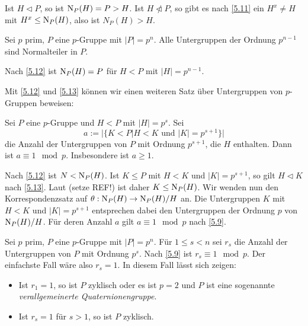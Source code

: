 \begin{beweis}
 Ist $H \vartriangleleft P$, so ist $\operatorname{N}_P(H)=P > H$. Ist $H\ntriangleleft P$, so gibt es nach \ref{5.11} ein $H^x \neq H$ mit $H^x\leq \operatorname{N}_P(H)$, also ist $N_P(H) > H$.
\end{beweis}

\begin{folgerung} \label{5.13}
 Sei $p$ prim, $P$ eine $p$-Gruppe mit $|P|=p^n$. Alle Untergruppen der Ordnung $p^{n-1}$ sind Normalteiler in $P$.
\end{folgerung}
\begin{beweis}
 Nach \ref{5.12} ist $\operatorname{N}_P(H) = P$ f\"ur $H < P$ mit $|H| = p^{n-1}$.
\end{beweis}

Mit \ref{5.12} und \ref{5.13} k\"onnen wir einen weiteren Satz \"uber Untergruppen von $p$-Gruppen beweisen:

\begin{satz}\label{5.14}
Sei $P$ eine $p$-Gruppe und $H < P$ mit $|H|=p^s$. Sei $$a:=|\lbrace K < P|H < K \text{ und } |K|=p^{s+1}\rbrace|$$ die Anzahl der Untergruppen von $P$ mit Ordnung $p^{s+1}$, die $H$ enthalten. Dann ist $a\equiv 1 \mod p$. Insbesondere ist $a\geq 1$.
\end{satz}

\begin{beweis}
 Nach \ref{5.12} ist $N < \operatorname{N}_P(H)$. Ist $K\leq P$ mit $H < K$ und $|K|=p^{s+1}$, so gilt $H\vartriangleleft K$ nach \ref{5.13}. Laut (setze REF!) ist daher $K\leq \operatorname{N}_P(H)$. Wir wenden nun den Korrespondenzsatz auf $\theta:\operatorname{N}_P(H)\to \operatorname{N}_P(H)/H$ an. Die Untergruppen $K$ mit $H < K$ und $|K|=p^{s+1}$ entsprechen dabei den Untergruppen der Ordnung $p$ von $\operatorname{N}_P(H)/H$. F\"ur deren Anzahl $a$ gilt $a\equiv 1\mod p$ nach \ref{5.9}.
\end{beweis}

\begin{bemerkung}
 Sei $p$ prim, $P$ eine $p$-Gruppe mit $|P|=p^n$. F\"ur $1\leq s < n$ sei $r_s$ die Anzahl der Untergruppen von $P$ mit Ordnung $p^s$. Nach \ref{5.9} ist $r_s\equiv 1\mod p$. Der einfachste Fall w\"are also $r_s=1$. In diesem Fall l\"asst sich zeigen:
\begin{itemize}
 \item Ist $r_1=1$, so ist $P$ zyklisch oder es ist $p=2$ und $P$ ist eine sogenannte \emph{verallgemeinerte Quaternionengruppe}.
 \item Ist $r_s=1$ f\"ur $s > 1$, so ist $P$ zyklisch.
\end{itemize}

\end{bemerkung}

